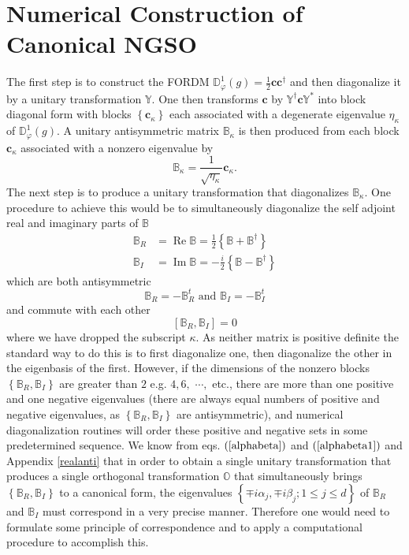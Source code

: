 \documentclass[preprint,aps,showkeys]{revtex4}%
\begin{document}
\section{Numerical Construction of Canonical NGSO\label{numerical}}

The first step is to construct the FORDM $\mathbb{D}_{\varphi}^{1}\left(
g\right)  =\frac{1}{2}\mathbf{cc}^{\dagger}$ and then diagonalize it by a
unitary transformation $\mathbb{Y}$. One then transforms $\mathbf{c}$ by
$\mathbb{Y}^{\dagger}\mathbf{c}\mathbb{Y}^{\ast}$ into block diagonal form
with blocks $\left\{  \mathbf{c}_{\kappa}\right\}  $ each associated with a
degenerate eigenvalue $\eta_{\kappa}$ of $\mathbb{D}_{\varphi}^{1}\left(
g\right)  .$ A unitary antisymmetric matrix $\mathbb{B}_{\kappa}$ is then
produced from each block $\mathbf{c}_{\kappa}$ associated with a nonzero
eigenvalue by
\begin{equation}
\mathbb{B}_{\kappa}=\frac{1}{\sqrt{\eta_{\kappa}}}\mathbf{c}_{\kappa}.
\end{equation}
The next step is to produce a unitary transformation that diagonalizes
$\mathbb{B}_{\kappa}$. One procedure to achieve this would be to
simultaneously diagonalize the self adjoint real and imaginary parts of
$\mathbb{B}$
\begin{align}
\mathbb{B}_{R}  &  =\operatorname{Re}\mathbb{B}=\frac{1}{2}\left\{
\mathbb{B+B}^{\dagger}\right\} \nonumber\\
\mathbb{B}_{I}  &  =\operatorname{Im}\mathbb{B}=-\frac{i}{2}\left\{
\mathbb{B-B}^{\dagger}\right\}
\end{align}
which are both antisymmetric
\begin{equation}
\mathbb{B}_{R}=-\mathbb{B}_{R}^{t}\text{ and }\mathbb{B}_{I}=-\mathbb{B}%
_{I}^{t}%
\end{equation}
and commute with each other
\begin{equation}
\left[  \mathbb{B}_{R},\mathbb{B}_{I}\right]  =0
\end{equation}
where we have dropped the subscript $\kappa$. As neither matrix is positive
definite the standard way to do this is to first diagonalize one, then
diagonalize the other in the eigenbasis of the first. However, if the
dimensions of the nonzero blocks $\left\{  \mathbb{B}_{R},\mathbb{B}%
_{I}\right\}  $ are greater than $2$ e.g. $4,6,$ $\cdots,$ etc., there are
more than one positive and one negative eigenvalues (there are always equal
numbers of positive and negative eigenvalues, as $\left\{  \mathbb{B}%
_{R},\mathbb{B}_{I}\right\}  $ are antisymmetric), and numerical
diagonalization routines will order these positive and negative sets in some
predetermined sequence. We know from eqs. $\left(  \ref{alphabeta}\right)  $
and $\left(  \ref{alphabeta1}\right)  $ and Appendix \ref{realanti} that in
order to obtain a single unitary transformation that produces a single
orthogonal transformation $\mathbb{O}$ that simultaneously brings $\left\{
\mathbb{B}_{R},\mathbb{B}_{I}\right\}  $ to a canonical form, the eigenvalues
$\left\{  \mp i\alpha_{j},\mp i\beta_{j};1\leq j\leq d\right\}  $ of
$\mathbb{B}_{R}$ and $\mathbb{B}_{I}$ must correspond in a very precise
manner. Therefore one would need to formulate some principle of correspondence
and to apply a computational procedure to accomplish this.
\end{document}
